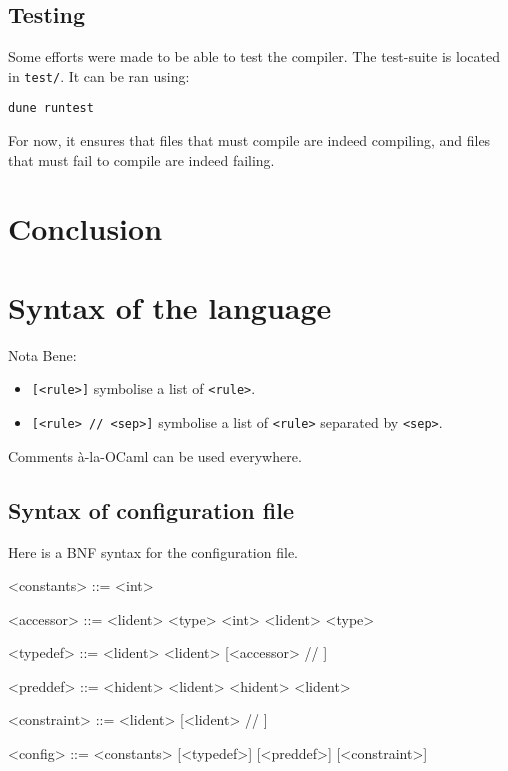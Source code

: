 \documentclass[10pt,a4paper]{article}
\begin{document}
\subsection{Testing}
Some efforts were made to be able to test the compiler. The test-suite is located in \verb|test/|. It can be ran using:
\begin{verbatim}
dune runtest
\end{verbatim}
For now, it ensures that files that must compile are indeed compiling, and files that must fail to compile are indeed failing.

\section{Conclusion}

\section{Syntax of the language}
Nota Bene:
\begin{itemize}
\item \verb|[<rule>]| symbolise a list of \verb|<rule>|.
\item \verb|[<rule> // <sep>]| symbolise a list of \verb|<rule>| separated by \verb|<sep>|.
\end{itemize}

Comments à-la-OCaml can be used everywhere.

\subsection{Syntax of configuration file}
\label{subsec:syntaxconfig} Here is a BNF syntax for the configuration file.
\begin{grammar}
  <constants> ::=
    \lit{=} <int>

  <accessor> ::=
  <lident>  <type>
  \alt <int> <lident>  <type>

  <typedef> ::=
   <lident>
  \alt {} <lident> \lit{=} [<accessor> // \lit{|}]

  <preddef> ::=
   <hident>  <lident>
  \alt {} <hident>  <lident>

  <constraint> ::=
   <lident>  [<lident> // \lit{|}]

  <config> ::=
  <constants> [<typedef>] [<preddef>] [<constraint>]
\end{grammar}
\end{document}
